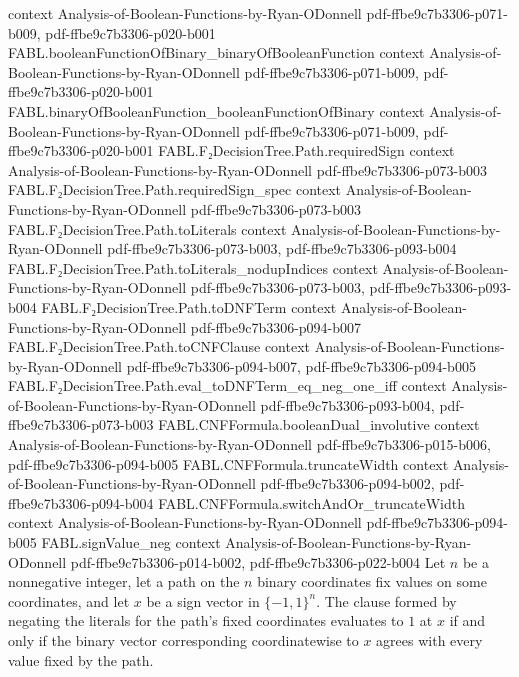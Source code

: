 \begin{theorem}
  {context}
  {Analysis-of-Boolean-Functions-by-Ryan-ODonnell}
  {pdf-ffbe9c7b3306-p071-b009,
    pdf-ffbe9c7b3306-p020-b001}
\proofstep
  {FABL.booleanFunctionOfBinary_binaryOfBooleanFunction}
  {context}
  {Analysis-of-Boolean-Functions-by-Ryan-ODonnell}
  {pdf-ffbe9c7b3306-p071-b009,
    pdf-ffbe9c7b3306-p020-b001}
\proofstep
  {FABL.binaryOfBooleanFunction_booleanFunctionOfBinary}
  {context}
  {Analysis-of-Boolean-Functions-by-Ryan-ODonnell}
  {pdf-ffbe9c7b3306-p071-b009,
    pdf-ffbe9c7b3306-p020-b001}
\proofstep
  {FABL.F₂DecisionTree.Path.requiredSign}
  {context}
  {Analysis-of-Boolean-Functions-by-Ryan-ODonnell}
  {pdf-ffbe9c7b3306-p073-b003}
\proofstep
  {FABL.F₂DecisionTree.Path.requiredSign_spec}
  {context}
  {Analysis-of-Boolean-Functions-by-Ryan-ODonnell}
  {pdf-ffbe9c7b3306-p073-b003}
\proofstep
  {FABL.F₂DecisionTree.Path.toLiterals}
  {context}
  {Analysis-of-Boolean-Functions-by-Ryan-ODonnell}
  {pdf-ffbe9c7b3306-p073-b003,
    pdf-ffbe9c7b3306-p093-b004}
\proofstep
  {FABL.F₂DecisionTree.Path.toLiterals_nodupIndices}
  {context}
  {Analysis-of-Boolean-Functions-by-Ryan-ODonnell}
  {pdf-ffbe9c7b3306-p073-b003,
    pdf-ffbe9c7b3306-p093-b004}
\proofstep
  {FABL.F₂DecisionTree.Path.toDNFTerm}
  {context}
  {Analysis-of-Boolean-Functions-by-Ryan-ODonnell}
  {pdf-ffbe9c7b3306-p094-b007}
\proofstep
  {FABL.F₂DecisionTree.Path.toCNFClause}
  {context}
  {Analysis-of-Boolean-Functions-by-Ryan-ODonnell}
  {pdf-ffbe9c7b3306-p094-b007,
    pdf-ffbe9c7b3306-p094-b005}
\proofstep
  {FABL.F₂DecisionTree.Path.eval_toDNFTerm_eq_neg_one_iff}
  {context}
  {Analysis-of-Boolean-Functions-by-Ryan-ODonnell}
  {pdf-ffbe9c7b3306-p093-b004,
    pdf-ffbe9c7b3306-p073-b003}
\proofstep
  {FABL.CNFFormula.booleanDual_involutive}
  {context}
  {Analysis-of-Boolean-Functions-by-Ryan-ODonnell}
  {pdf-ffbe9c7b3306-p015-b006,
    pdf-ffbe9c7b3306-p094-b005}
\proofstep
  {FABL.CNFFormula.truncateWidth}
  {context}
  {Analysis-of-Boolean-Functions-by-Ryan-ODonnell}
  {pdf-ffbe9c7b3306-p094-b002,
    pdf-ffbe9c7b3306-p094-b004}
\proofstep
  {FABL.CNFFormula.switchAndOr_truncateWidth}
  {context}
  {Analysis-of-Boolean-Functions-by-Ryan-ODonnell}
  {pdf-ffbe9c7b3306-p094-b005}
\proofstep
  {FABL.signValue_neg}
  {context}
  {Analysis-of-Boolean-Functions-by-Ryan-ODonnell}
  {pdf-ffbe9c7b3306-p014-b002,
    pdf-ffbe9c7b3306-p022-b004}
Let $n$ be a nonnegative integer, let a path on the $n$ binary coordinates fix values on
some coordinates, and let $x$ be a sign vector in $\{-1,1\}^n$. The clause formed by
negating the literals for the path's fixed coordinates evaluates to $1$ at $x$ if and
only if the binary vector corresponding coordinatewise to $x$ agrees with every value
fixed by the path.
\end{theorem}

